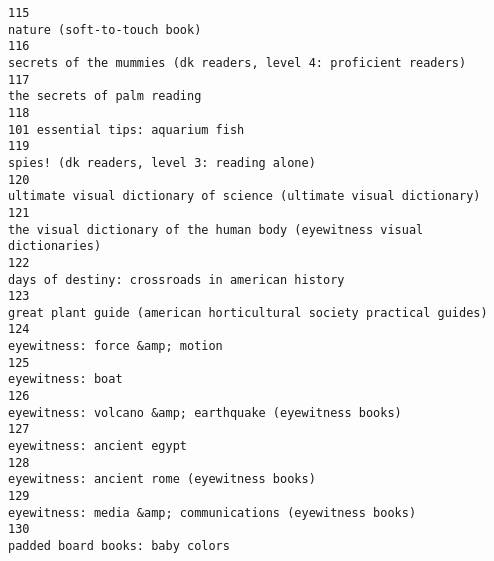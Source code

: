 \documentclass[
]{report}
\begin{document}
\begin{verbatim}
115                                                                                                                                           nature (soft-to-touch book)
116                                                                                                      secrets of the mummies (dk readers, level 4: proficient readers)
117                                                                                                                                           the secrets of palm reading
118                                                                                                                                     101 essential tips: aquarium fish
119                                                                                                                           spies! (dk readers, level 3: reading alone)
120                                                                                                    ultimate visual dictionary of science (ultimate visual dictionary)
121                                                                                              the visual dictionary of the human body (eyewitness visual dictionaries)
122                                                                                                                       days of destiny: crossroads in american history
123                                                                                                   great plant guide (american horticultural society practical guides)
124                                                                                                                                        eyewitness: force &amp; motion
125                                                                                                                                                      eyewitness: boat
126                                                                                                               eyewitness: volcano &amp; earthquake (eyewitness books)
127                                                                                                                                             eyewitness: ancient egypt
128                                                                                                                           eyewitness: ancient rome (eyewitness books)
129                                                                                                             eyewitness: media &amp; communications (eyewitness books)
130                                                                                                                                       padded board books: baby colors

\end{verbatim}
\end{document}
